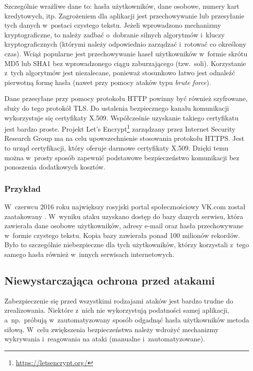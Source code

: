 \documentclass[12pt,a4paper,polish,thesis]{dcsbook}
\begin{document}
Szczególnie wrażliwe dane to: hasła użytkowników, dane osobowe, numery kart kredytowych, itp. Zagrożeniem dla aplikacji jest przechowywanie lub przesyłanie tych danych w~postaci czystego tekstu. Jeżeli wprowadzono mechanizmy kryptograficzne, to należy zadbać o~dobranie silnych algorytmów i~kluczy kryptograficznych (którymi należy odpowiednio zarządzać i~rotować co określony czas). Wciąż popularne jest przechowywanie haseł użytkowników w~formie skrótu MD5 lub SHA1 bez wprowadzonego ciągu zaburzającego (tzw.~soli). Korzystanie z~tych algorytmów jest niezalecane, ponieważ stosunkowo łatwo jest odnaleźć pierwotną formę hasła (nawet przy pomocy ataków typu \textit{brute force}). 

Dane przesyłane przy pomocy protokołu HTTP powinny być również szyfrowane, służy do tego protokół TLS. Do ustalenia bezpiecznego kanału komunikacji wykorzystuje się certyfikaty X.509. Współcześnie uzyskanie takiego certyfikatu jest bardzo proste. Projekt Let's Encrypt\footnote{\url{https://letsencrypt.org/}} zarządzany przez Internet Security Research Group ma na celu upowszechnienie stosowania protokołu HTTPS. Jest to urząd certyfikacji, który oferuje darmowe certyfikaty X.509. Dzięki temu można w~prosty sposób zapewnić podstawowe bezpieczeństwo komunikacji bez ponoszenia dodatkowych kosztów.

\subsubsection*{Przykład}
 W~czerwcu 2016 roku największy rosyjski portal społecznościowy VK.com został zaatakowany \cite{vk}. W~wyniku ataku uzyskano dostęp do bazy danych serwisu, która zawierała dane osobowe użytkowników, adresy e-mail oraz hasła przechowywane w~formie czystego tekstu. Kopia bazy zawierała ponad 100 milionów rekordów. Było to szczególnie niebezpieczne dla tych użytkowników, którzy korzystali z~tego samego hasła również w~innych serwisach internetowych. 


\subsection{Niewystarczająca ochrona przed atakami}
Zabezpieczenie się przed wszystkimi rodzajami ataków jest bardzo trudne do zrealizowania. Niektóre z~nich nie wykorzystują podatności samej aplikacji, a~np.~próbują w~zautomatyzowany sposób odgadnąć hasła użytkowników metoda siłową. W~celu zwiększenia bezpieczeństwa należy wdrożyć mechanizmy wykrywania i~reagowania na ataki (manualne i~zautomatyzowane).
\end{document}
